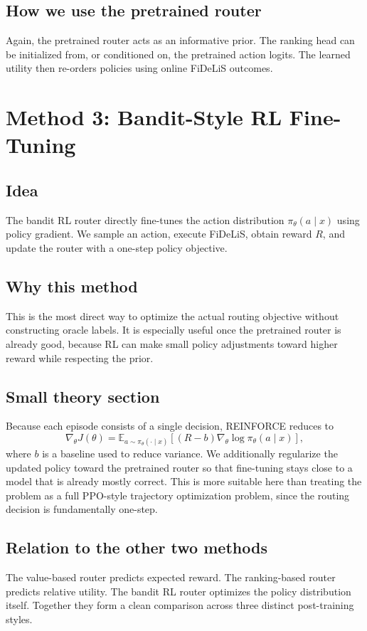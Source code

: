 \documentclass[11pt]{article}
\begin{document}
\subsection{How we use the pretrained router}
Again, the pretrained router acts as an informative prior. The ranking head can be initialized from, or conditioned on, the pretrained action logits. The learned utility then re-orders policies using online FiDeLiS outcomes.

\section{Method 3: Bandit-Style RL Fine-Tuning}
\subsection{Idea}
The bandit RL router directly fine-tunes the action distribution $\pi_\theta(a \mid x)$ using policy gradient. We sample an action, execute FiDeLiS, obtain reward $R$, and update the router with a one-step policy objective.

\subsection{Why this method}
This is the most direct way to optimize the actual routing objective without constructing oracle labels. It is especially useful once the pretrained router is already good, because RL can make small policy adjustments toward higher reward while respecting the prior.

\subsection{Small theory section}
Because each episode consists of a single decision, REINFORCE reduces to
\[
\nabla_\theta J(\theta)
=
\mathbb{E}_{a \sim \pi_\theta(\cdot \mid x)}
\left[(R-b)\nabla_\theta \log \pi_\theta(a \mid x)\right],
\]
where $b$ is a baseline used to reduce variance. We additionally regularize the updated policy toward the pretrained router so that fine-tuning stays close to a model that is already mostly correct. This is more suitable here than treating the problem as a full PPO-style trajectory optimization problem, since the routing decision is fundamentally one-step.

\subsection{Relation to the other two methods}
The value-based router predicts expected reward. The ranking-based router predicts relative utility. The bandit RL router optimizes the policy distribution itself. Together they form a clean comparison across three distinct post-training styles.
\end{document}
